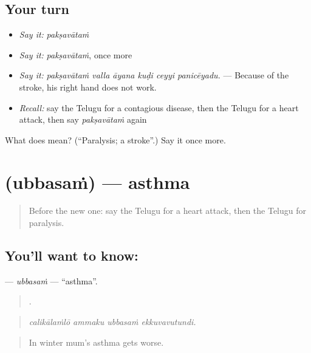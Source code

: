 \subsection*{Your turn}
\begin{itemize}
\raggedright
  \item \emph{Say it:} \emph{pakṣavātaṁ}
  \item \emph{Say it:} \emph{pakṣavātaṁ}, once more
  \item \emph{Say it:} \emph{pakṣavātaṁ valla āyana kuḍi ceyyi panicēyadu.} — Because of the stroke, his right hand does not work.
  \item \emph{Recall:} say the Telugu for a contagious disease, then the Telugu for a heart attack, then say \emph{pakṣavātaṁ} again
\end{itemize}

\begin{tcolorbox}[breakable,colback=teal!4,colframe=teal!35!black,title={Before you move on}]
What does  mean? (\textquotedblleft{}Paralysis; a stroke\textquotedblright{}.) Say it once more.
\end{tcolorbox}
\section[\texorpdfstring{\te{ఉబ్బసం} (ubbasaṁ)}{ఉబ్బసం (ubbasaṁ)}]{ (ubbasaṁ) — asthma}

\label{lesson:TE-C513-ubbasam}



\begin{quote}
Before the new one: say the Telugu for a heart attack, then the Telugu for paralysis.
\end{quote}

\subsection*{You'll want to know: }
\textbf{} — \emph{ubbasaṁ} — \textquotedblleft{}asthma\textquotedblright{}.

\begin{quote}
   .
\end{quote}

\begin{quote}
\emph{calikālaṁlō ammaku ubbasaṁ ekkuvavutundi.}
\end{quote}

\begin{quote}
In winter mum's asthma gets worse.
\end{quote}

